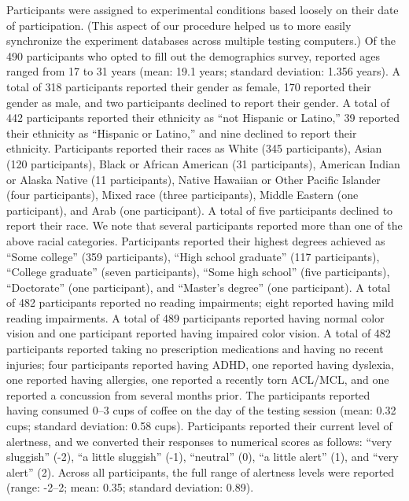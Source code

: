 \documentclass[11pt]{article}
\begin{document}
Participants were assigned to experimental conditions based loosely on their
date of participation. (This aspect of our procedure helped us to more easily
synchronize the experiment databases across multiple testing computers.) Of the
490 participants who opted to fill out the demographics survey, reported ages
ranged from 17 to 31 years (mean: 19.1 years; standard deviation: 1.356 years).
A total of 318 participants reported their gender as female, 170 reported their gender as male, and
two participants declined to report their gender. A total of 442 participants
reported their ethnicity as ``not Hispanic or Latino,'' 39 reported their ethnicity as ``Hispanic or
Latino,'' and nine declined to report their ethnicity. Participants reported
their races as White (345 participants), Asian (120 participants), Black or
African American (31 participants), American Indian or Alaska Native (11
participants), Native Hawaiian or Other Pacific Islander (four participants),
Mixed race (three participants), Middle Eastern (one participant), and Arab
(one participant). A total of five participants declined to report their race.
We note that several participants reported more than one of the above racial
categories. Participants reported their highest degrees achieved as ``Some
college'' (359 participants), ``High school graduate'' (117 participants),
``College graduate'' (seven participants), ``Some high school'' (five
participants), ``Doctorate'' (one participant), and ``Master's degree'' (one
participant). A total of 482 participants reported no reading impairments;
eight reported having mild reading impairments. A total of 489 participants
reported having normal color vision and one participant reported having
impaired color vision. A total of 482 participants reported taking no
prescription medications and having no recent injuries; four participants
reported having ADHD, one reported having dyslexia, one reported having
allergies, one reported a recently torn ACL/MCL, and one reported a concussion
from several months prior. The participants reported having consumed 0--3 cups of
coffee on the day of the testing session (mean: 0.32 cups; standard deviation: 0.58
cups). Participants reported their current level of alertness, and we converted
their responses to numerical scores as follows: ``very sluggish'' (-2), ``a
little sluggish'' (-1), ``neutral'' (0), ``a little alert'' (1), and ``very
alert'' (2). Across all participants, the full range of alertness levels were
reported (range: -2--2; mean: 0.35; standard deviation: 0.89).
\end{document}
